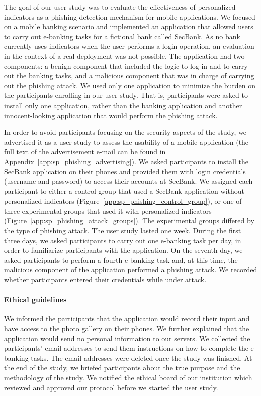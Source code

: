 The goal of our user study was to evaluate the effectiveness of personalized indicators as a phishing-detection mechanism for mobile applications.
We focused on a mobile banking scenario and implemented an application that allowed users to carry out e-banking tasks for a fictional bank called SecBank.
As no bank currently uses indicators when the user performs a login operation, an evaluation in the context of a real deployment was not possible.
The application had two components: a benign component that included the logic to log in and to carry out the banking tasks, and a malicious component that was in charge of carrying out the phishing attack. We used only one application to minimize the burden on the participants enrolling in our user study. That is, participants were asked to install only one application, rather than the banking application and another innocent-looking application that would perform the phishing attack.

In order to avoid participants focusing on the security aspects of the study, we advertised it as a user study to assess the usability of a mobile application (the full text of the advertisement e-mail can be found in Appendix~\ref{app:sp_phishing_advertising}).
We asked participants to install the SecBank application on their phones and provided them with login credentials (username and password) to access their accounts at SecBank.
We assigned each participant to either a control group that used a SecBank application without personalized indicators (Figure~\ref{app:sp_phishing_control_group}), or one of three experimental groups that used it with personalized indicators (Figure~\ref{app:sp_phishing_attack_groups}).
The experimental groups differed by the type of phishing attack. The user study lasted one week.
During the first three days, we asked participants to carry out one e-banking task per day, in order to familiarize participants with the application.
On the seventh day, we asked participants to perform a fourth e-banking task and, at this time, the malicious component of the application performed a phishing attack.
We recorded whether participants entered their credentials while under attack.

\paragraph{Ethical guidelines} We informed the participants that the
application would record their input and have access to the photo gallery on
their phones. We further explained that the application would send no personal
information to our servers. We collected the participants' email addresses to
send them instructions on how to complete the e-banking tasks. The email
addresses were deleted once the study was finished. At the end of the study, we
briefed participants about the true purpose and the methodology of the study.
We notified the ethical board of our institution which reviewed and approved
our protocol before we started the user study.

